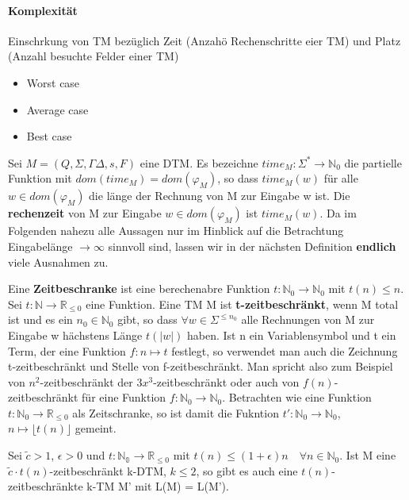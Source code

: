 \paragraph*{Komplexität} 
    Einschrkung von TM bezüglich Zeit (Anzahö Rechenschritte eier TM) und Platz (Anzahl besuchte Felder einer TM)
    \begin{itemize}
        \item Worst case
        \item Average case
        \item Best case
    \end{itemize}

    Sei \(M = (Q, \Sigma, \Gamma \Delta, s, F)\) eine DTM. Es bezeichne \(time_M:\Sigma^* \to \mathbb{N}_0\) die partielle Funktion mit \(dom(time_M) = dom (\varphi_M)\), so dass \(time_M(w)\) für alle \(w \in dom (\varphi_M)\) die länge der Rechnung von M zur Eingabe w ist. Die \textbf{rechenzeit} von M zur Eingabe \(w \in dom (\varphi_M)\) ist \(time_M(w)\). 
    \medskip
    Da im Folgenden nahezu alle Aussagen nur im Hinblick auf die Betrachtung Eingabelänge \(\to \infty\) sinnvoll sind, lassen wir in der nächsten Definition \textbf{endlich} viele Ausnahmen zu.

    Eine \textbf{Zeitbeschranke} ist eine berechenabre Funktion \(t: \mathbb{N}_0 \to \mathbb{N}_0\) mit \(t(n)\leq n\). Sei \(t: \mathbb{N}\to \mathbb{R}_{\leq 0}\) eine Funktion. Eine TM M ist \textbf{t-zeitbeschränkt}, wenn M total ist und es ein \(n_0 \in \mathbb{N}_0\) gibt, so dass \(\forall w \in \Sigma^{\leq n_0}\) alle Rechnungen von M zur Eingabe w hächstens Länge \(t(|w|)\) haben.
    \medskip
    Ist n ein Variablensymbol und t ein Term, der eine Funktion \(f: n \mapsto t\) festlegt, so verwendet man auch die Zeichnung t-zeitbeschränkt und Stelle von f-zeitbeschränkt. Man spricht also zum Beispiel von \(n^2\)-zeitbeschränkt der \(3x^3\)-zeitbeschränkt oder auch von \(f(n)\)-zeitbeschränkt für eine Funktion \(f: \mathbb{N}_0 \to \mathbb{N}_0\). Betrachten wie eine Funktion \(t: \mathbb{N}_0 \to \mathbb{R}_{\leq 0}\) als Zeitschranke, so ist damit die Fukntion \(t': \mathbb{N}_0 \to \mathbb{N}_0\), \(n \mapsto \lfloor t(n)\rfloor\) gemeint.

    Sei \(\tilde{c} > 1\), \(\epsilon > 0\) und \(t: \mathbb{N_0} \to \mathbb{R}_{\leq 0}\) mit \(t(n) \leq (1+ \epsilon)n \quad \forall n \in \mathbb{N}_0\). Ist M eine \(\tilde{c}\cdot t(n)\)-zeitbeschränkt k-DTM, \(k \leq 2\), so gibt es auch eine \(t(n)\)-zeitbeschränkte k-TM M' mit L(M) = L(M').

